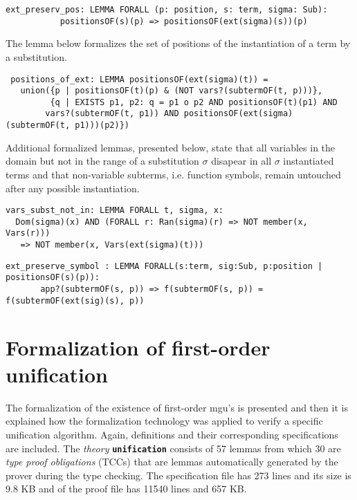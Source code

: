 \documentclass[submission,copyright,creativecommons]{eptcs}
\begin{document}
{\small
\begin{verbatim}
ext_preserv_pos: LEMMA FORALL (p: position, s: term, sigma: Sub):
           positionsOF(s)(p) => positionsOF(ext(sigma)(s))(p)
\end{verbatim}
}

The lemma below formalizes the set of positions of the instantiation
of a term by a substitution.

{\small
\begin{verbatim}
 positions_of_ext: LEMMA positionsOF(ext(sigma)(t)) = 
   union({p | positionsOF(t)(p) & (NOT vars?(subtermOF(t, p)))}, 
         {q | EXISTS p1, p2: q = p1 o p2 AND positionsOF(t)(p1) AND 
        vars?(subtermOF(t, p1)) AND positionsOF(ext(sigma)(subtermOF(t, p1)))(p2)})
\end{verbatim}}

  Additional formalized lemmas, presented below, state that all
  variables in the domain but not in the range of a substitution
  $\sigma$ disapear in all $\sigma$ instantiated terms and that
  non-variable subterms, i.e. function symbols, remain untouched after
  any possible instantiation.

  {\small
\begin{verbatim}
vars_subst_not_in: LEMMA FORALL t, sigma, x: 
  Dom(sigma)(x) AND (FORALL r: Ran(sigma)(r) => NOT member(x, Vars(r)))
   => NOT member(x, Vars(ext(sigma)(t)))
\end{verbatim}
  } {\small
\begin{verbatim}
ext_preserve_symbol : LEMMA FORALL(s:term, sig:Sub, p:position | positionsOF(s)(p)):
       app?(subtermOF(s, p)) => f(subtermOF(s, p)) = f(subtermOF(ext(sig)(s), p)) 
\end{verbatim}
  }
  
  \section{Formalization of first-order
    unification}\label{Sec:formalization}

  The formalization of the existence of first-order mgu's is presented
  and then it is explained how the formalization technology was
  applied to verify a specific unification algorithm. Again,
  definitions and their corresponding specifications are included.
  The \emph{theory} {\tt \bf unification} consists of 57 lemmas from
  which 30 are \emph{type proof obligations} (TCCs) that are lemmas
  automatically generated by the prover during the type checking. The
  specification file has 273 lines and its size is 9.8 KB and of the
  proof file has 11540 lines and 657 KB.
\end{document}
